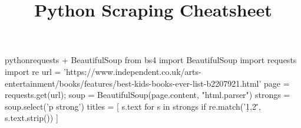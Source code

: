 \documentclass[10pt,a4paper]{article}
\title{\color{w3schools}Python Scraping Cheatsheet
}
\begin{document}
\maketitle

\small
\begin{multicols}{3}

\thispagestyle{empty}
\scriptsize



\begin{codebox}{python}{requests + BeautifulSoup}
from bs4 import BeautifulSoup
import requests
import re
url = 'https://www.independent.co.uk/arts-entertainment/books/features/best-kids-books-ever-list-b2207921.html'
page = requests.get(url);
soup = BeautifulSoup(page.content, "html.parser")
strongs = soup.select('p strong')
titles = [ s.text for s in strongs if re.match('\d{1,2}\.', s.text.strip()) ]

\end{codebox}


\AtNextBibliography{\footnotesize}
\printbibliography  
\end{multicols}
\end{document}
